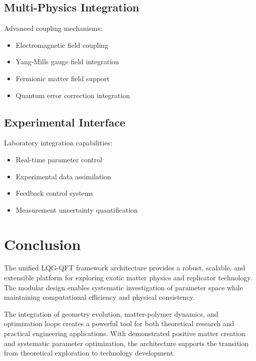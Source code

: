 \documentclass[11pt]{article}
\begin{document}
\subsection{Multi-Physics Integration}

Advanced coupling mechanisms:
\begin{itemize}
\item Electromagnetic field coupling
\item Yang-Mills gauge field integration
\item Fermionic matter field support
\item Quantum error correction integration
\end{itemize}

\subsection{Experimental Interface}

Laboratory integration capabilities:
\begin{itemize}
\item Real-time parameter control
\item Experimental data assimilation
\item Feedback control systems
\item Measurement uncertainty quantification
\end{itemize}

\section{Conclusion}

The unified LQG-QFT framework architecture provides a robust, scalable, and extensible platform for exploring exotic matter physics and replicator technology. The modular design enables systematic investigation of parameter space while maintaining computational efficiency and physical consistency.

The integration of geometry evolution, matter-polymer dynamics, and optimization loops creates a powerful tool for both theoretical research and practical engineering applications. With demonstrated positive matter creation and systematic parameter optimization, the architecture supports the transition from theoretical exploration to technology development.
\end{document}
